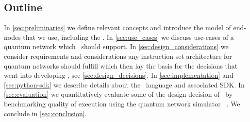 \subsection{Outline}
In \cref{sec:preliminaries} we define relevant concepts and introduce the model of end-nodes that we use, including the \QNPU.
In \cref{sec:use_cases} we discuss use-cases of a quantum network which \netqasm\ should support.
In \cref{sec:design_considerations} we consider requirements and considerations any instruction set architecture for quantum networks should fulfill which then lay the basis for the decisions that went into developing \netqasm, see \cref{sec:design_decisions}.
In \cref{sec:implementation} and \cref{sec:python-sdk} we describe details about the \netqasm\ language and associated SDK.
In \cref{sec:evaluation} we quantitatively evaluate some of the design decision of \netqasm\ by benchmarking quality of execution using the quantum network simulator \netsquid~\cite{netsquid,coopmans2021netsquid}.
We conclude in \cref{sec:conclusion}.



\begin{xstretch}
\printbibliography[heading=subbibintoc,title={References},notcategory=noprint]
\end{xstretch}
